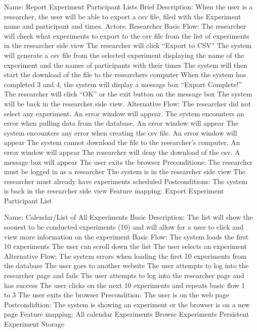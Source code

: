 \begin{outline}[enumerate]
\1 Name: Report Experiment Participant Lists
\2 Brief Description:  When the user is a researcher, the user will be able to export a csv file, filed with the Experiment name and participant and times.
\2 Actors: Researcher
\2 Basic Flow:
\3 The researcher will check what experiments to export to the csv file from the list of experiments in the researcher side view
\3 The researcher will click “Export to CSV”
\3 The system will generate a csv file from the selected experiment displaying the name of the experiment and the names of participants with their times
\3 The system will then start the download of the file to the researchers computer
\3 When the system has completed 3 and 4, the system will display a message box “Export Complete!”
\3 The researcher will click “OK” or the exit button on the message box
\3 The system will be back in the researcher side view.
\2 Alternative Flow:
\3 The researcher did not select any experiment.  An error window will appear.
\3 The system encounters an error when pulling data from the database. An error window will appear
\3 The system encounters any error when creating the csv file. An error window will appear
\3 The system cannot download the file to the researcher’s computer. An error window will appear
\3 The researcher will deny the download of the csv.  A message box will appear
\3 The user exits the browser
\2 Preconditions:
\3 The researcher must be logged in as a researcher
\3 The system is in the researcher side view
\3 The researcher must already have experiments scheduled
\2 Postconditions:
\3 The system is back in the researcher side view
\2 Feature mapping:
\3 Export Experiment Participant List

\1 Name: Calendar/List of All Experiments
\2 Basic Description: The list will show the soonest to be conducted experiments (10) and will allow for a user to click and view more information on the experiment
\2 Basic Flow:
\3 The system loads the first 10 experiments
\3 The user can scroll down the list
\3 The user selects an experiment
\2 Alternative Flow:
\3The system errors when loading the first 10 experiments from the database
\3 The user goes to another website
\3 The user attempts to log into the researcher page and fails
\3 The user attempts to log into the researcher page and has success
\3 The user clicks on the next 10 experiments and repeats basic flow 1 to 3
\3 The user exits the browser
\2 Precondition:
\3 The user is on the web page
\2 Postcondidtion:
\3 The system is showing an experiment or the browser is on a new page
\2 Feature mapping:
\3 All calendar Experiments
\3 Browse Experiments
\3 Persistent Experiment Storage



\end{outline}